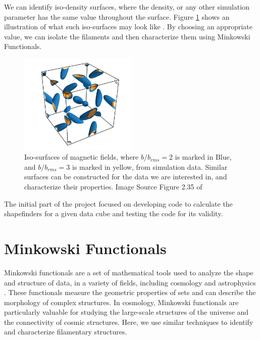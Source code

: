 \documentclass{article}
\begin{document}
We can identify iso-density surfaces, where the density, or any other simulation parameter has the same value throughout the surface. Figure \ref{fig:b_field_isosurfaces} shows an illustration of what such iso-surfaces may look like \cite{AmitSetaThesis}. By choosing an appropriate value, we can isolate the filaments and then characterize them using Minkowski Functionals. 


\begin{figure}[h!]
    \centering
    \includegraphics[width=0.5\textwidth]{Images/b_field_isosurfaces.png}
    \caption{Iso-surfaces of magnetic fields, where $b/b_{rms} = 2$ is marked in Blue, and $b/b_{rms} = 3$ is marked in yellow, from simulation data. Similar surfaces can be constructed for the data we are interested in, and characterize their properties. Image Source Figure 2.35 of \cite{AmitSetaThesis}}
    \label{fig:b_field_isosurfaces}
\end{figure}



The initial part of the project focused on developing code to calculate the shapefinders for a given data cube and testing the code for its validity.

\section{Minkowski Functionals}
Minkowski functionals are a set of mathematical tools used to analyze the shape and structure of data, in a variety of fields, including cosmology and astrophysics \cite{1999PaperMinkowskiFunctionalsInCosmology}. These functionals measure the geometric properties of sets and can describe the morphology of complex structures. In cosmology, Minkowski functionals are particularly valuable for studying the large-scale structures of the universe and the connectivity of cosmic structures. Here, we use similar techniques to identify and characterize filamentary structures.
\end{document}
